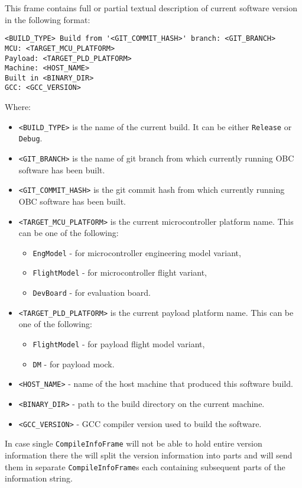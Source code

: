 This frame contains full or partial textual description of current \OBC software version in the following format:\bigskip\\
\begin{verbatim}
<BUILD_TYPE> Build from '<GIT_COMMIT_HASH>' branch: <GIT_BRANCH>
MCU: <TARGET_MCU_PLATFORM>
Payload: <TARGET_PLD_PLATFORM>
Machine: <HOST_NAME>
Built in <BINARY_DIR>
GCC: <GCC_VERSION>
\end{verbatim}
Where:
\begin{itemize}
	\item \texttt{<BUILD_TYPE>} is the name of the current build. It can be either \texttt{Release} or \texttt{Debug}.
	\item \texttt{<GIT_BRANCH>} is the name of git branch from which currently running OBC software has been built.
	\item \texttt{<GIT_COMMIT_HASH>} is the git commit hash from which currently running OBC software has been built.
	\item \texttt{<TARGET_MCU_PLATFORM>} is the current microcontroller platform name. This can be one of the following: 
	\begin{itemize}
		\item \texttt{EngModel} - for microcontroller engineering model variant,
		\item \texttt{FlightModel} - for microcontroller flight variant,
		\item \texttt{DevBoard} - for evaluation board.
	\end{itemize}
	\item \texttt{<TARGET_PLD_PLATFORM>} is the current payload platform name. This can be one of the following: 
	\begin{itemize}
		\item \texttt{FlightModel} - for payload flight model variant,
		\item \texttt{DM} - for payload mock.
	\end{itemize}
	\item \texttt{<HOST_NAME>} - name of the host machine that produced this \OBC software build.
	\item \texttt{<BINARY_DIR>} - path to the build directory on the current machine.
	\item \texttt{<GCC_VERSION>} - GCC compiler version used to build the \OBC software.
\end{itemize}

In case single \texttt{CompileInfoFrame} will not be able to hold entire version information there the \OBC will split the version information into parts and will send them in separate \texttt{CompileInfoFrame}s each containing subsequent parts of the information string. 

